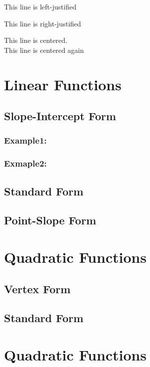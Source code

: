 \documentclass[11pt]{article}
\begin{document}
\begin{flushleft}
This line is left-justified
\end{flushleft}

\begin{flushright}
This line is right-justified
\end{flushright}

\Large
This line is centered.\\
This line is centered again
\section*{Linear Functions}
	\subsection*{Slope-Intercept Form}
		\subsubsection*{Example1:}
		\subsubsection{Exmaple2:}
	\subsection{Standard Form}
	\subsection{Point-Slope Form}
\section*{Quadratic Functions}
	\subsection{Vertex Form}
	\subsection{Standard Form}
\section{Quadratic Functions}
\end{document}
